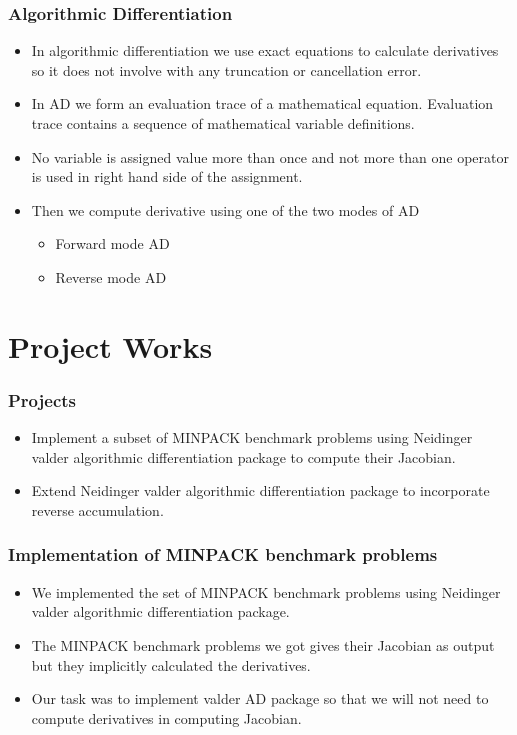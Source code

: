 \documentclass[10pt]{beamer}
\begin{document}
\begin{frame}
\frametitle{Algorithmic Differentiation}
\begin{itemize}
\item In algorithmic differentiation we use exact equations to calculate derivatives so it does not involve with any truncation or cancellation error.
\item In AD we form an evaluation trace of a mathematical equation. Evaluation trace contains a sequence of mathematical variable definitions.
\item No variable is assigned value more than once and not more than one operator is used in right hand side of the assignment.
\item Then we compute derivative using one of the two modes of AD
\begin{itemize}
\item Forward mode AD
\item Reverse mode AD
\end{itemize}
\end{itemize}
\end{frame}

\section{Project Works}
\begin{frame}
\frametitle{Projects}
\begin{itemize}
\item Implement a subset of MINPACK benchmark problems using Neidinger valder algorithmic differentiation package to compute their Jacobian.
\item Extend Neidinger valder algorithmic differentiation package to incorporate reverse accumulation.

\end{itemize}
\end{frame}
\begin{frame}
\frametitle{Implementation of MINPACK benchmark problems}
\begin{itemize}
\item  We implemented the set of MINPACK benchmark problems using  Neidinger valder algorithmic differentiation package.
\item The MINPACK benchmark problems we got gives their Jacobian as output but they implicitly calculated the derivatives.
\item Our task was to implement valder AD package so that we will not need to compute derivatives in computing Jacobian.

\end{itemize}
\end{frame}
\end{document}
